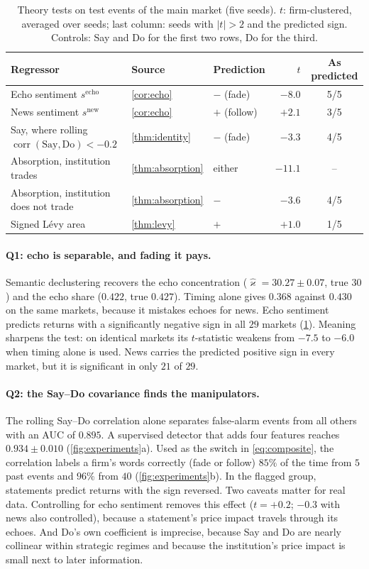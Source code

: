 \documentclass{article}
\theoremstyle{plain}
\theoremstyle{definition}
\theoremstyle{remark}
\begin{document}
\begin{table}[t]
\caption{Theory tests on test events of the main market (five seeds). $t$: firm-clustered, averaged over seeds; last column: seeds with $|t|>2$ and the predicted sign. Controls: Say and Do for the first two rows, Do for the third.}
\label{tab:mainTests}
\centering
\small
\begin{tabular}{@{}lllrc@{}}
\toprule
Regressor & Source & Prediction & $t$ & As predicted \\
\midrule
Echo sentiment $s^{\text{echo}}$ & \cref{cor:echo} & $-$ (fade) & $-8.0$ & 5/5 \\
News sentiment $s^{\text{new}}$ & \cref{cor:echo} & $+$ (follow) & $+2.1$ & 3/5 \\
Say, where rolling $\operatorname{corr}(\text{Say},\text{Do})<-0.2$ & \cref{thm:identity} & $-$ (fade) & $-3.3$ & 4/5 \\
Absorption, institution trades & \cref{thm:absorption} & either & $-11.1$ & -- \\
Absorption, institution does not trade & \cref{thm:absorption} & $-$ & $-3.6$ & 4/5 \\
Signed L\'evy area & \cref{thm:levy} & $+$ & $+1.0$ & 1/5 \\
\bottomrule
\end{tabular}
\end{table}

\paragraph{Q1: echo is separable, and fading it pays.} Semantic declustering recovers the echo concentration ($\hat\varkappa=30.27\pm0.07$, true $30$) and the echo share ($0.422$, true $0.427$). Timing alone gives $0.368$ against $0.430$ on the same markets, because it mistakes echoes for news. Echo sentiment predicts returns with a significantly negative sign in all $29$ markets (\cref{tab:mainTests}). Meaning sharpens the test: on identical markets its $t$-statistic weakens from $-7.5$ to $-6.0$ when timing alone is used. News carries the predicted positive sign in every market, but it is significant in only $21$ of $29$.

\paragraph{Q2: the Say--Do covariance finds the manipulators.} The rolling Say--Do correlation alone separates false-alarm events from all others with an AUC of $0.895$. A supervised detector that adds four features reaches $0.934\pm0.010$ (\cref{fig:experiments}a). Used as the switch in \eqref{eq:composite}, the correlation labels a firm's words correctly (fade or follow) $85\%$ of the time from $5$ past events and $96\%$ from $40$ (\cref{fig:experiments}b). In the flagged group, statements predict returns with the sign reversed. Two caveats matter for real data. Controlling for echo sentiment removes this effect ($t=+0.2$; $-0.3$ with news also controlled), because a statement's price impact travels through its echoes. And Do's own coefficient is imprecise, because Say and Do are nearly collinear within strategic regimes and because the institution's price impact is small next to later information.
\end{document}
